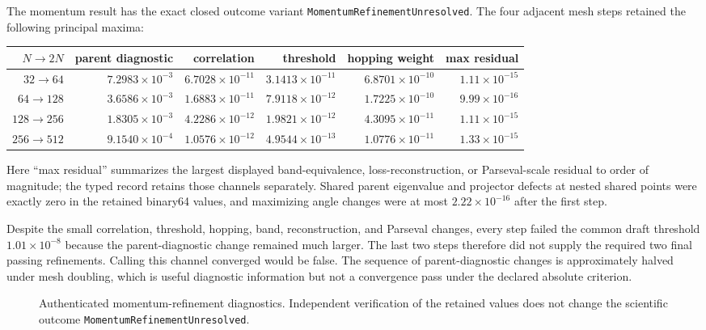 The momentum result has the exact closed outcome variant
\texttt{MomentumRefinementUnresolved}.  The four adjacent
mesh steps retained the following principal maxima:
\begin{center}
\small
\begin{tabular}{@{}rrrrrr@{}}
\toprule
$N\to2N$ & parent diagnostic & correlation & threshold & hopping weight &
max residual\\
\midrule
$32\to64$   & $7.2983\!\times10^{-3}$ & $6.7028\!\times10^{-11}$ & $3.1413\!\times10^{-11}$ & $6.8701\!\times10^{-10}$ & $1.11\!\times10^{-15}$\\
$64\to128$  & $3.6586\!\times10^{-3}$ & $1.6883\!\times10^{-11}$ & $7.9118\!\times10^{-12}$ & $1.7225\!\times10^{-10}$ & $9.99\!\times10^{-16}$\\
$128\to256$ & $1.8305\!\times10^{-3}$ & $4.2286\!\times10^{-12}$ & $1.9821\!\times10^{-12}$ & $4.3095\!\times10^{-11}$ & $1.11\!\times10^{-15}$\\
$256\to512$ & $9.1540\!\times10^{-4}$ & $1.0576\!\times10^{-12}$ & $4.9544\!\times10^{-13}$ & $1.0776\!\times10^{-11}$ & $1.33\!\times10^{-15}$\\
\bottomrule
\end{tabular}
\end{center}
Here ``max residual'' summarizes the largest displayed band-equivalence,
loss-reconstruction, or Parseval-scale residual to order of magnitude; the typed record
retains those channels separately.  Shared parent eigenvalue and projector defects at
nested shared points were exactly zero in the retained binary64 values, and maximizing
angle changes were at most $2.22\times10^{-16}$ after the first step.

Despite the small correlation, threshold, hopping, band, reconstruction, and Parseval
changes, every step failed the common draft threshold
$1.01\times10^{-8}$ because the parent-diagnostic change remained much larger.  The last
two steps therefore did not supply the required two final passing refinements.  Calling
this channel converged would be false.  The sequence of parent-diagnostic changes is
approximately halved under mesh doubling, which is useful diagnostic information but
not a convergence pass under the declared absolute criterion.

\begin{figure}[htbp]
 \centering
 \caption{Authenticated momentum-refinement diagnostics.  Independent verification of
 the retained values does not change the scientific outcome
 \texttt{MomentumRefinementUnresolved}.}
\end{figure}

